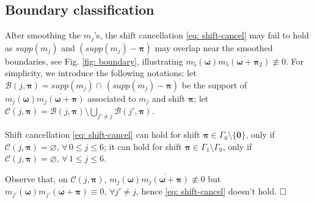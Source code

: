 \subsection{Boundary classification}
 After smoothing the $m_j$'s, the shift cancellation \eqref{eq: shift-cancel} may fail to hold as $supp(m_j)$ and $(supp(m_j)-\boldsymbol{\pi})$ may overlap near the smoothed boundaries, see Fig. \ref{fig: boundary}, illustrating $m_5(\boldsymbol{\omega})\overline{m_5(\boldsymbol{\omega} + \boldsymbol{\pi}_2)}\not\equiv 0.$
For simplicity, we introduce the following notations: let 
$\mathcal{B}(j,\boldsymbol{\pi}) =  supp(m_j)\cap\,(supp(m_j)-\boldsymbol{\pi})$ be the support of  $m_j(\boldsymbol{\omega})\overline{m_j(\boldsymbol{\omega} + \boldsymbol{\pi})}$ associated to $m_j$ and shift $\boldsymbol{\pi}$;
let $\mathcal{C}(j,\boldsymbol{\pi}) = \mathcal{B}(j,\boldsymbol{\pi}) \setminus \bigcup_{j'\neq j}\mathcal{B}(j',\boldsymbol{\pi})$. 
\begin{lem}\label{lem: singular-bdy}
Shift cancellation \eqref{eq: shift-cancel} can hold for shift $\boldsymbol{\pi}\in\Gamma_0\setminus\{\boldsymbol{0}\}$, only if $\mathcal{C}(j,\boldsymbol{\pi})=\varnothing,\, \forall\, 0\leq j\leq 6$; 
it can hold for shift $\boldsymbol{\pi}\in\Gamma_1\setminus\Gamma_0$, only if $\mathcal{C}(j,\boldsymbol{\pi})=\varnothing,\, \forall\, 1\leq j\leq 6$. 
\end{lem}
 Observe that, on $\mathcal{C}(j,\boldsymbol{\pi})$, $m_j(\boldsymbol{\omega})\overline{m_{j}(\boldsymbol{\omega}+\boldsymbol{\pi})} \not\equiv 0$ but $m_{j'}(\boldsymbol{\omega})\overline{m_{j'}(\boldsymbol{\omega}+\boldsymbol{\pi})} \equiv 0,\, \forall j' \neq j$, hence \eqref{eq: shift-cancel} doesn't hold. $\hfill\square$
 
